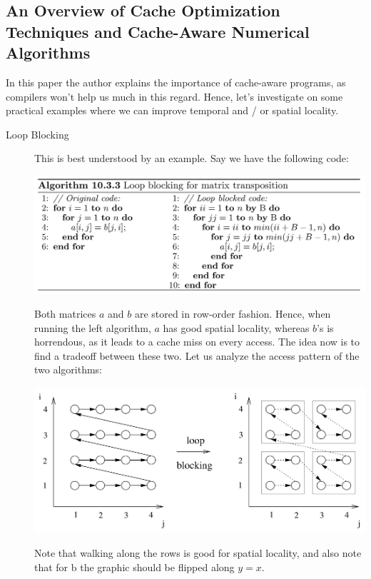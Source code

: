 \documentclass[../../main.tex]{subfiles}
\begin{document}
\bigskip
\subsection{An Overview of Cache Optimization Techniques and Cache-Aware Numerical Algorithms}
In this paper the author explains the importance of cache-aware programs, as compilers won't help us much in this regard. Hence, let's investigate on some practical examples where we can improve temporal and / or spatial locality.

\begin{description}
    \item[Loop Blocking] This is best understood by an example. Say we have the following code:
    
    \includegraphics[width=\linewidth]{chapters/09/loop_blocking.png}

    Both matrices $a$ and $b$ are stored in row-order fashion. Hence, when running the left algorithm, $a$ has good spatial locality, whereas $b$'s is horrendous, as it leads to a cache miss on every access. The idea now is to find a tradeoff between these two. Let us analyze the access pattern of the two algorithms:

    \includegraphics[width=\linewidth]{chapters/09/access_pattern.png}

    Note that walking along the rows is good for spatial locality, and also note that for b the graphic should be flipped along $y=x$.


\end{description}
\end{document}
